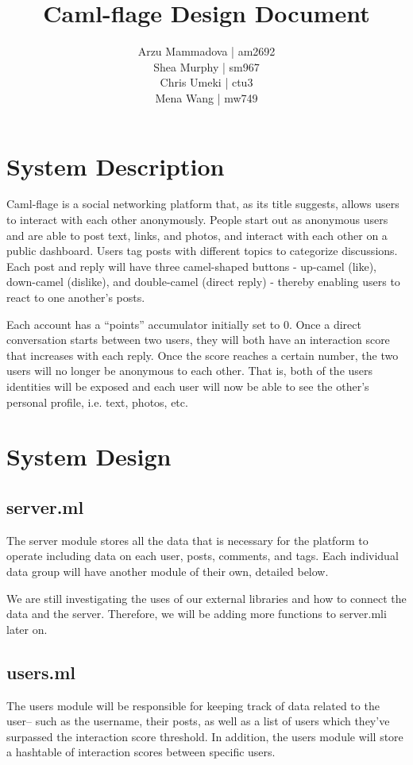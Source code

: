 \documentclass[11pt]{article}
\title{Caml-flage Design Document}
\author{Arzu Mammadova | am2692 \\ Shea Murphy | sm967 \\ Chris Umeki | ctu3 \\ Mena Wang | mw749}
\begin{document}
\maketitle

\section{System Description}
Caml-flage is a social networking platform that, as its title suggests, allows users to interact with each other anonymously. People start out as anonymous users and are able to post text, links, and photos, and interact with each other on a public dashboard. Users tag posts with different topics to categorize discussions. Each post and reply will have three camel-shaped buttons - up-camel (like), down-camel (dislike), and double-camel (direct reply) - thereby enabling users to react to one another’s posts. 

Each account has a “points” accumulator initially set to 0. Once a direct conversation starts between two users, they will both have an interaction score that increases with each reply. Once the score reaches a certain number, the two users will no longer be anonymous to each other. That is, both of the users identities will be exposed and each user will now be able to see the other’s personal profile, i.e. text, photos, etc. 

\section{System Design}

\subsection{server.ml}
The server module stores all the data that is necessary for the platform to operate including data on each user, posts, comments, and tags. Each individual data group will have another module of their own, detailed below. 

We are still investigating the uses of our external libraries and how to connect the data and the server. Therefore, we will be adding more functions to server.mli later on. 

\subsection{users.ml}
The users module will be responsible for keeping track of data related to the user-- such as the username, their posts, as well as a list of users which they’ve surpassed the interaction score threshold. In addition, the users module will store a hashtable of interaction scores between specific users. 
\end{document}
